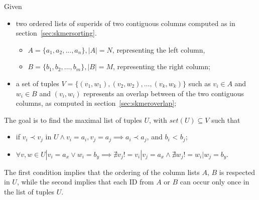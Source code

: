 \begin{definition}
	Given 
	\begin{itemize}
		\item two ordered lists of super\kmer ids of two contiguous columns computed as in section~\ref{sec:skmersorting}.
		\begin{itemize}
			\item $ A = \{a_1, a_2, ..., a_n\}, |A| = N $, representing the left column,
			\item $ B = \{b_1, b_2, ..., b_m\}, |B| = M $, representing the right column;
		\end{itemize}
		\item a set of tuples $ V = \{(v_1,w_1),(v_2,w_2), ..., (v_k,w_k) \}$ such as $ v_i \in A$ and $ w_i \in B$ and $(v_i,w_i)$ represents an overlap between \kmers of the two contiguous columns, as computed in section~\ref{sec:skmeroverlap};
	\end{itemize}
	The goal is to find the maximal list of tuples  $U$, with $set(U) \subseteq V$ such that 
	\begin{itemize}
		\item if $v_i \prec v_j$ in $U \land v_i=a_i, v_j=a_j \implies a_i \prec a_j$, and $b_i$ < $b_j$;
		\item $\forall v, w \in U | v_i = a_x \lor w_i = b_y \implies \nexists v_j != v_i | v_j = a_x \land \nexists w_j != w_i | w_j = b_y$.  
	\end{itemize}
	The first condition implies that the ordering of the column lists $A$, $B$ is respected in $U$, while the second implies that each \skmer ID from $A$ or $B$ can occur only once in the list of tuples $U$.
\end{definition}

